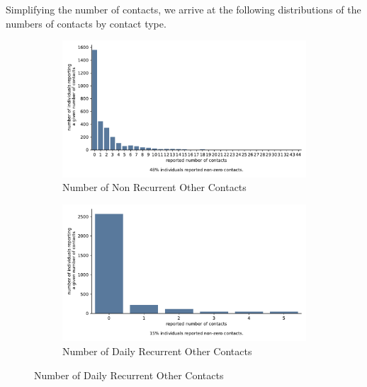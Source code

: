 Simplifying the number of contacts, we arrive at the following distributions of the
numbers of contacts by contact type.

\begin{figure}
    \centering

    \begin{subfigure}[b]{0.25\textwidth}
        \centering

        \includegraphics[width=\textwidth]{figures/results/figures/data/distributions_of_the_number_of_contacts/other_non_recurrent}
        \caption{Number of Non Recurrent Other Contacts}
        \label{n_contacts_other_non_recurrent}
    \end{subfigure}

    \hfill

    \begin{subfigure}[b]{0.25\textwidth}
        \centering
        \includegraphics[width=\textwidth]{figures/results/figures/data/distributions_of_the_number_of_contacts/other_recurrent_daily}
        \caption{Number of Daily Recurrent Other Contacts}
        \label{n_contacts_other_daily_recurrent}
    \end{subfigure}


\end{figure}
